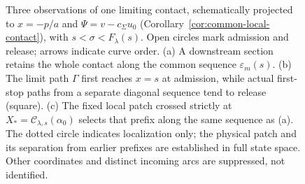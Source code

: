 \begin{figure}[!htbp]
\caption{Three observations of one limiting contact, schematically
projected to $x=-p/a$ and $\Psi=v-c_\Sigma u_0$
(Corollary~\ref{cor:common-local-contact}), with $s<\sigma<F_\lambda(s)$.
Open circles mark admission and release; arrows indicate curve order.
(a) A downstream section retains the whole contact along the common
sequence $\varepsilon_m(s)$.
(b) The limit path $\Gamma$ first reaches $x=s$ at admission, while
actual first-stop paths from a separate diagonal sequence tend to
release (square).
(c) The fixed local patch crossed strictly at
$X_*=\mathcal C_{\lambda,s}(\alpha_0)$ selects that prefix along the
same sequence as (a). The dotted circle indicates localization only;
the physical patch and its separation from earlier prefixes are
established in full state space. Other coordinates and distinct
incoming arcs are suppressed, not identified.}
\label{fig:observation-rules}
\end{figure}
